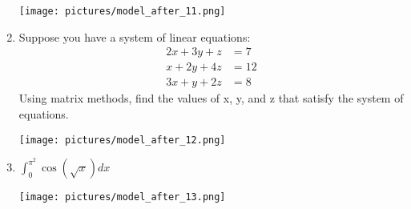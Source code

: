 \documentclass{article}
\begin{document}
\begin{enumerate}
			\texttt{[image: pictures/model\_after\_11.png]}
		\item Suppose you have a system of linear equations: 
		\begin{equation*}
			\begin{aligned}
				2x + 3y + z & = 7 \\
				x + 2y + 4z & = 12 \\
				3x + y + 2z & = 8 
			\end{aligned}
		\end{equation*}
		Using matrix methods, find the values of x, y, and z that satisfy the system of equations.\par
			\texttt{[image: pictures/model\_after\_12.png]}
		\item $\int_{0}^{\pi^2} \cos(\sqrt{x}) dx $\par
			\texttt{[image: pictures/model\_after\_13.png]}
	\end{enumerate}
\end{document}
